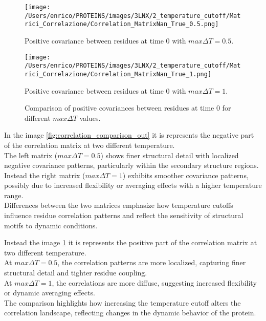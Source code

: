 \documentclass[English, Lau, oneside]{sapthesis}
\begin{document}
\begin{figure}[h!]
    \centering
    \begin{minipage}{0.49\textwidth}
        \centering
        \texttt{[image: /Users/enrico/PROTEINS/images/3LNX/2\_temperature\_cutoff/Matrici\_Correlazione/Correlation\_MatrixNan\_True\_0.5.png]}
        \caption{Positive covariance between residues at time 0 with $max \Delta T = 0.5$.}
        
    \end{minipage}
    \hfill
    \begin{minipage}{0.49\textwidth}
        \centering
        \texttt{[image: /Users/enrico/PROTEINS/images/3LNX/2\_temperature\_cutoff/Matrici\_Correlazione/Correlation\_MatrixNan\_True\_1.png]}
        \caption{Positive covariance between residues at time 0 with $max \Delta T = 1$.}
        
    \end{minipage}
    \caption{Comparison of positive covariances between residues at time 0 for different $max \Delta T$ values.}
    \label{fig:correlation_positive_comparison_out}
\end{figure}



In the image \ref{fig:correlation_comparison_out} it is represents the negative part of the correlation matrix at two different temperature.\\
The left matrix (\(max \Delta T = 0.5\)) shows finer structural detail with localized negative covariance patterns, particularly within the secondary structure regions.\\
Instead the right matrix (\(max \Delta T = 1\)) exhibits smoother covariance patterns, possibly due to increased flexibility or averaging effects with a higher temperature range.\\
Differences between the two matrices emphasize how temperature cutoffs influence residue correlation patterns and reflect the sensitivity of structural motifs to dynamic conditions.

Instead the image \ref{fig:correlation_positive_comparison_out} it is represents the positive part of the correlation matrix at two different temperature.\\
At \(max \Delta T = 0.5\), the correlation patterns are more localized, capturing finer structural detail and tighter residue coupling.\\
At \(max \Delta T = 1\), the correlations are more diffuse, suggesting increased flexibility or dynamic averaging effects.\\
The comparison highlights how increasing the temperature cutoff alters the correlation landscape, reflecting changes in the dynamic behavior of the protein.
\end{document}
